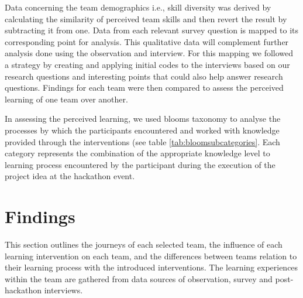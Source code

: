 \documentclass[runningheads]{llncs}
\begin{document}
Data concerning the team demographics i.e., skill diversity was derived by calculating the similarity of perceived team skills and then revert the result by subtracting it from one. %
Data from each relevant survey question is mapped to its corresponding point for analysis. This qualitative data will complement further analysis done using the observation and interview. For this mapping we followed a strategy \cite{braun2006using} by creating and applying initial codes to the interviews based on our research questions and interesting points that could also help answer research questions. Findings for each team were then compared to assess the perceived learning of one team over another.

In assessing the perceived learning, we used blooms taxonomy\cite{bloom1956taxonomy,krathwohl2009taxonomy} to analyse the processes by which the participants encountered and worked with knowledge provided through the interventions (see table \ref{tab:bloomsubcategories}. Each category represents the combination of the appropriate knowledge level to learning process encountered by the participant during the execution of the project idea at the hackathon event.

\section{Findings}
This section outlines the journeys of each selected team, the influence of each learning intervention on each team, and the differences between teams relation to their learning process with the introduced interventions.
The learning experiences within the team are gathered from data sources of observation, survey and  post-hackathon interviews. 
\end{document}
